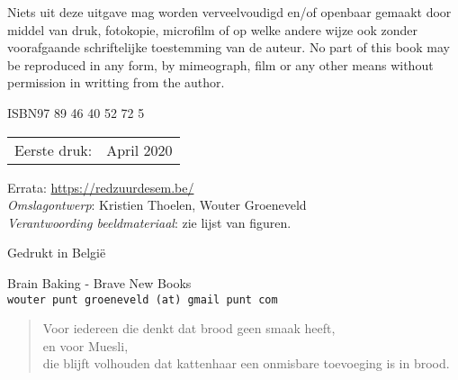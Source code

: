 Niets uit deze uitgave mag worden verveelvoudigd en/of openbaar gemaakt door middel van druk, fotokopie, microfilm of op welke andere wijze ook zonder voorafgaande schriftelijke toestemming van de auteur. \newline
No part of this book may be reproduced in any form, by mimeograph, film or any other means without permission in writting from the author. 

\begin{center}
 ISBN\hspace{2em}97 89 46 40 52 72 5
\end{center}

\begin{center}
\begin{tabular}{ll}
Eerste druk:  & April 2020 \\
\end{tabular}
\end{center}

\vfill

Errata: \url{https://redzuurdesem.be/} \\

\hspace*{2em} \textit{Omslagontwerp}: Kristien Thoelen, Wouter Groeneveld \\
\hspace*{2em} \textit{Verantwoording beeldmateriaal}: zie lijst van figuren. \\

\vfill

Gedrukt in België

Brain Baking - Brave New Books \\
\texttt{wouter punt groeneveld (at) gmail punt com}

\vspace*{2\baselineskip}
\clearpage


 \newenvironment{dedication}
     {\vspace{6ex}\begin{quotation}\begin{center}\begin{em}}
     {\par\end{em}\end{center}\end{quotation}}

\begin{dedication}
	Voor iedereen die denkt dat brood geen smaak heeft, \\
	en voor Muesli, \\
  die blijft volhouden dat kattenhaar een onmisbare toevoeging is in brood. 
\end{dedication}

\endgroup
\clearpage


\pagestyle{empty}

\renewcommand*\contentsname{Inhoudsopgave}
{
  \setcounter{tocdepth}{2}
  \tableofcontents*
}

\clearpage
\pagestyle{desem}

